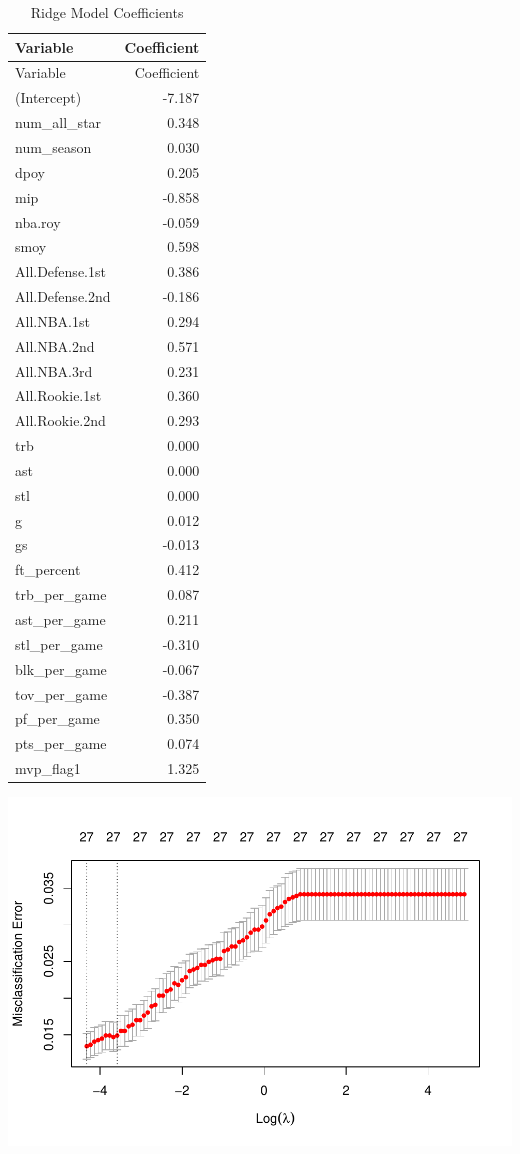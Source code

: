 \documentclass[
  11pt,
]{article}
\begin{document}
\begin{longtable}[]{@{}lr@{}}
\caption{Ridge Model Coefficients}\tabularnewline
\toprule\noalign{}
Variable & Coefficient \\
\midrule\noalign{}
\endfirsthead
\toprule\noalign{}
Variable & Coefficient \\
\midrule\noalign{}
\endhead
\bottomrule\noalign{}
\endlastfoot
(Intercept) & -7.187 \\
num\_all\_star & 0.348 \\
num\_season & 0.030 \\
dpoy & 0.205 \\
mip & -0.858 \\
nba.roy & -0.059 \\
smoy & 0.598 \\
All.Defense.1st & 0.386 \\
All.Defense.2nd & -0.186 \\
All.NBA.1st & 0.294 \\
All.NBA.2nd & 0.571 \\
All.NBA.3rd & 0.231 \\
All.Rookie.1st & 0.360 \\
All.Rookie.2nd & 0.293 \\
trb & 0.000 \\
ast & 0.000 \\
stl & 0.000 \\
g & 0.012 \\
gs & -0.013 \\
ft\_percent & 0.412 \\
trb\_per\_game & 0.087 \\
ast\_per\_game & 0.211 \\
stl\_per\_game & -0.310 \\
blk\_per\_game & -0.067 \\
tov\_per\_game & -0.387 \\
pf\_per\_game & 0.350 \\
pts\_per\_game & 0.074 \\
mvp\_flag1 & 1.325 \\
\end{longtable}

\includegraphics{report_files/figure-latex/unnamed-chunk-15-1.pdf}
\end{document}

